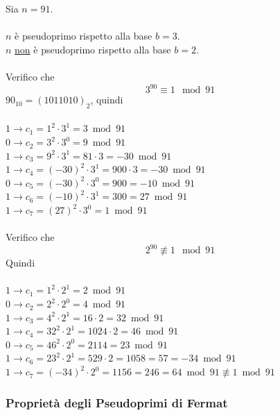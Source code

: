 \documentclass[a4paper,12pt, oneside]{book}
\begin{document}
			\begin{shaded}
				\begin{esempio}
					Sia $n = 91$.\\\\
					$n$ è pseudoprimo rispetto alla base $b=3$.\\
					$n$ \underline{non} è pseudoprimo rispetto alla base $b=2$.\\\\
					Verifico che 
					$$3^{90} \equiv 1 \mod 91$$
					$90_{10} = (1011010)_{2}$, quindi\\\\
					$1 \rightarrow c_1 = 1^2 \cdot 3^1 = 3 \bmod 91$\\
					$0 \rightarrow c_2 = 3^2 \cdot 3^0 = 9 \bmod 91$\\
					$1 \rightarrow c_3 = 9^2 \cdot 3^1 = 81 \cdot 3 = -30 \bmod 91$\\
					$1 \rightarrow c_4 = (-30)^2 \cdot 3^1 = 900 \cdot 3 = -30 \bmod 91$\\
					$0 \rightarrow c_5 = (-30)^2 \cdot 3^0 = 900 = -10 \bmod 91$\\
					$1 \rightarrow c_6 = (-10)^2 \cdot 3^1 = 300 = 27 \bmod 91$\\
					$1 \rightarrow c_7 = (27)^2 \cdot 3^0 = 1 \bmod 91$\\\\
					Verifico che 
					$$2^{90} \not\equiv 1 \mod 91$$
					Quindi\\\\
					$1 \rightarrow c_1 = 1^2 \cdot 2^1 = 2 \bmod 91$\\
					$0 \rightarrow c_2 = 2^2 \cdot 2^0 = 4 \bmod 91$\\
					$1 \rightarrow c_3 = 4^2 \cdot 2^1 = 16 \cdot 2 = 32 \bmod 91$\\
					$1 \rightarrow c_4 = 32^2 \cdot 2^1 = 1024 \cdot 2 = 46 \bmod 91$\\
					$0 \rightarrow c_5 = 46^2 \cdot 2^0 = 2114 = 23 \bmod 91$\\
					$1 \rightarrow c_6 = 23^2 \cdot 2^1 = 529 \cdot 2 = 1058 = 57 = -34 \bmod 91$\\
					$1 \rightarrow c_7 = (-34)^2 \cdot 2^0 = 1156 = 246 = 64 \bmod 91 \not\equiv 1 \bmod 91$
				\end{esempio}
			\end{shaded}
			
			\subsubsection{Proprietà degli Pseudoprimi di Fermat}
			
\end{document}
